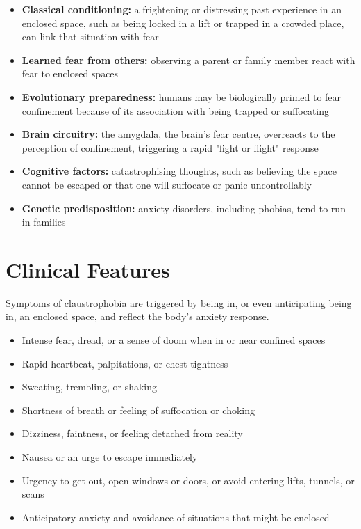 \begin{itemize}
    \item \textbf{Classical conditioning:} a frightening or distressing past experience in an enclosed space, such as being locked in a lift or trapped in a crowded place, can link that situation with fear
    \item \textbf{Learned fear from others:} observing a parent or family member react with fear to enclosed spaces
    \item \textbf{Evolutionary preparedness:} humans may be biologically primed to fear confinement because of its association with being trapped or suffocating
    \item \textbf{Brain circuitry:} the amygdala, the brain's fear centre, overreacts to the perception of confinement, triggering a rapid "fight or flight" response
    \item \textbf{Cognitive factors:} catastrophising thoughts, such as believing the space cannot be escaped or that one will suffocate or panic uncontrollably
    \item \textbf{Genetic predisposition:} anxiety disorders, including phobias, tend to run in families
\end{itemize}

\section*{Clinical Features}
Symptoms of claustrophobia are triggered by being in, or even anticipating being in, an enclosed space, and reflect the body's anxiety response.

\begin{itemize}
    \item Intense fear, dread, or a sense of doom when in or near confined spaces
    \item Rapid heartbeat, palpitations, or chest tightness
    \item Sweating, trembling, or shaking
    \item Shortness of breath or feeling of suffocation or choking
    \item Dizziness, faintness, or feeling detached from reality
    \item Nausea or an urge to escape immediately
    \item Urgency to get out, open windows or doors, or avoid entering lifts, tunnels, or scans
    \item Anticipatory anxiety and avoidance of situations that might be enclosed
\end{itemize}

